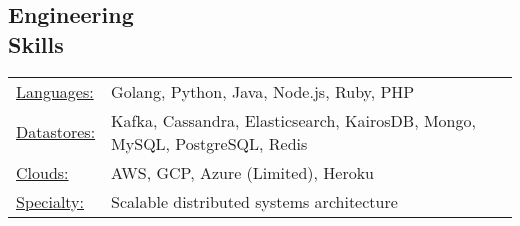 \documentclass[margin]{res}
\begin{document}
\begin{resume}
\section{Engineering \\ Skills}
   \begin{tabular}{l p{3in}}
    \underline{Languages:} & %
    Golang, Python, Java, Node.js, Ruby, PHP \\
    \underline{Datastores:} & Kafka, Cassandra, Elasticsearch, KairosDB, Mongo, %
    MySQL, 
    PostgreSQL,
    Redis \\
\underline{Clouds:} & AWS, GCP, Azure (Limited),
Heroku \\
\underline{Specialty:} & Scalable distributed systems architecture
\end{tabular}



\end{resume}
\end{document}
